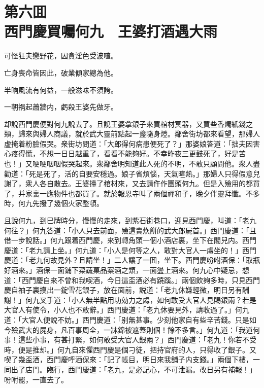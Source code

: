 
\chapter*{第六囬　\\西門慶買囑何九　王婆打酒遇大雨}


\begin{myquote}
可怪狂夫戀野花，因貪淫色受波喳。

亡身喪命皆因此，破業傾家總為他。

半晌風流有何益，一般滋味不須誇。

一朝祸起蕭牆内，虧殺王婆先做牙。
\end{myquote}

却說西門慶便對何九說去了。且說王婆拿銀子來買棺材冥器，又買些香燭紙錢之類，歸來與婦人商議，就於武大靈前點起一盞隨身燈。鄰舍街坊都來看望，那婦人虚掩着粉臉假哭。衆街坊問道：「大郎得何病患便死了？」那婆娘答道：「拙夫因害心疼得慌，不想一日日越重了，看看不能夠好。不幸昨夜三更鼓死了，好是苦也！」又哽哽咽咽假哭起來。衆鄰舍明知道此人死的不明，不敢只顧問他。衆人盡勸道：「死是死了，活的自要安穩過。娘子省煩惱，天氣暄熱。」那婦人只得假意兒謝了，衆人各自散去。王婆擡了棺材來，又去請仵作團頭何九。但是入殮用的都買了，并家裏一應物件也都買了。就於報恩寺叫了兩個禪和子，晚夕伴靈拜懺。不多時，何九先撥了幾個火家整頓。

且說何九，到巳牌時分，慢慢的走來，到紫石街巷口，迎見西門慶，叫道：「老九何往？」何九答道：「小人只去前面，殮這賣炊餅的武大郎屍首。」西門慶道：「且借一步說話。」何九跟着西門慶，來到轉角頭一個小酒店裏，坐下在閣兒内。西門慶道：「老九請上坐。」何九道：「小人是何等之人，敢對大官人一䖏坐的！」西門慶道：「老九何故見外？且請坐！」二人讓了一囬，坐下。西門慶吩咐酒保：「取瓶好酒來。」酒保一面鋪下菜蔬菓品案酒之類，一面盪上酒來。何九心中疑忌，想道：「西門慶自來不曾和我喫酒，今日這盃酒必有蹺蹊。」兩個飲夠多時，只見西門慶自袖子裏摸出一錠雪花銀子，放在面前，説道：「老九休嫌輕微，明日另有酬謝！」何九叉手道：「小人無半點用功効力之䖏，如何敢受大官人見賜銀兩？若是大官人有使令，小人也不敢辭。」西門慶道：「老九休要見外，請收過了。」何九道：「大官人便說不妨。」西門慶道：「别無甚事。少刻他家自有些辛苦錢。只是如今殮武大的屍身，凡百事周全，一牀錦被遮蓋則個！餘不多言。」何九道：「我道何事！這些小事，有甚打緊，如何敢受大官人銀兩？」西門慶道：「老九！你若不受時，便是推却。」何九自來懼西門慶是個刁徒，把持官府的人，只得收了銀子。又喫了幾盃酒，西門慶呼酒保來：「記了帳目，明日來我舖子内支錢。」兩個下樓，一同出了店門。臨行，西門慶道：「老九，是必記心，不可泄漏。改日另有補報！」吩咐罷，一直去了。

